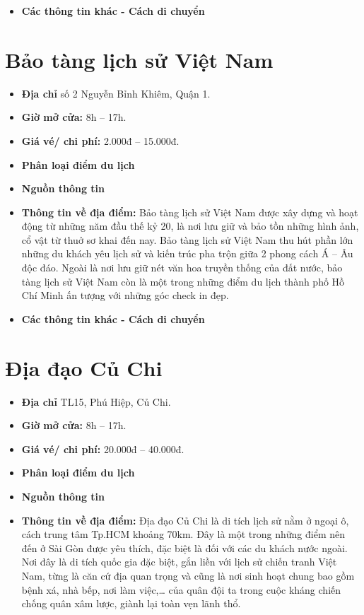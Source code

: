 \documentclass{article}
\begin{document}
\begin{itemize}
    \item{\textbf{Các thông tin khác - Cách di chuyển}}
\end{itemize}

\section{Bảo tàng lịch sử Việt Nam}
\begin{itemize}
    \item{\textbf{Địa chỉ}} số 2 Nguyễn Bỉnh Khiêm, Quận 1.
    \item{\textbf{Giờ mở cửa:}} 8h – 17h.
    \item{\textbf{Giá vé/ chi phí:}} 2.000đ – 15.000đ.
    \item{\textbf{Phân loại điểm du lịch}}
    \item{\textbf{Nguồn thông tin}}
    \item{\textbf{Thông tin về địa điểm:}} Bảo tàng lịch sử Việt Nam được xây dựng và hoạt động từ những năm đầu thế kỷ 20, là nơi lưu giữ và bảo tồn những hình ảnh, cổ vật từ thuở sơ khai đến nay. Bảo tàng lịch sử Việt Nam thu hút phần lớn những du khách yêu lịch sử và kiến trúc pha trộn giữa 2 phong cách Á – Âu độc đáo. Ngoài là nơi lưu giữ nét văn hoa truyền thống của đất nước, bảo tàng lịch sử Việt Nam còn là một trong những điểm du lịch thành phố Hồ Chí Minh ấn tượng với những góc check in đẹp.
\end{itemize}

\begin{itemize}
    \item{\textbf{Các thông tin khác - Cách di chuyển}}
\end{itemize}

\section{Địa đạo Củ Chi}
\begin{itemize}
    \item{\textbf{Địa chỉ}} TL15, Phú Hiệp, Củ Chi.
    \item{\textbf{Giờ mở cửa:}} 8h – 17h.
    \item{\textbf{Giá vé/ chi phí:}} 20.000đ – 40.000đ.
    \item{\textbf{Phân loại điểm du lịch}}
    \item{\textbf{Nguồn thông tin}}
    \item{\textbf{Thông tin về địa điểm:}} Địa đạo Củ Chi là di tích lịch sử nằm ở ngoại ô, cách trung tâm Tp.HCM khoảng 70km. Đây là một trong những điểm nên đến ở Sài Gòn được yêu thích, đặc biệt là đối với các du khách nước ngoài. Nơi đây là di tích quốc gia đặc biệt, gắn liền với lịch sử chiến tranh Việt Nam, từng là căn cứ địa quan trọng và cũng là nơi sinh hoạt chung bao gồm bệnh xá, nhà bếp, nơi làm việc,… của quân đội ta trong cuộc kháng chiến chống quân xâm lược, giành lại toàn vẹn lãnh thổ.
\end{itemize}
\end{document}
